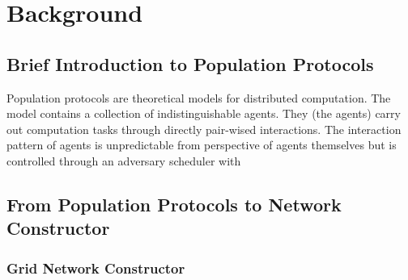 \section{Background}
\subsection{Brief Introduction to Population Protocols \cite{AspnesR2007}}
Population protocols are theoretical models for distributed computation.
The model contains a collection of indistinguishable agents.
They (the agents) carry out computation tasks through directly pair-wised interactions.
The interaction pattern of agents is unpredictable from perspective of agents themselves
but is controlled through an adversary scheduler with
\subsection{From Population Protocols to Network Constructor}
\subsubsection{Grid Network Constructor}

